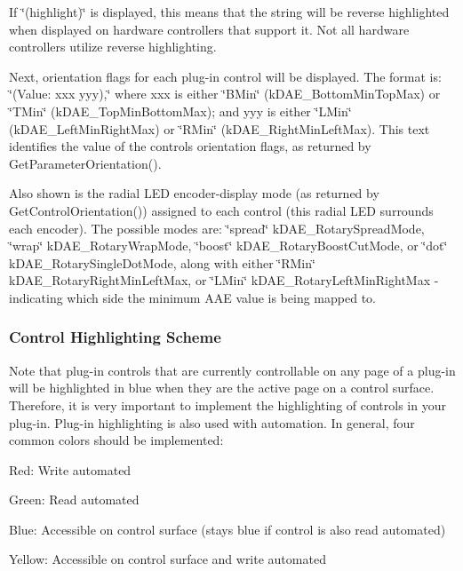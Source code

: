 \begin{DoxyItemize}
\begin{DoxyItemize}
\item If \char`\"{}(highlight)\char`\"{} is displayed, this means that the string will be reverse highlighted when displayed on hardware controllers that support it. Not all hardware controllers utilize reverse highlighting. 
\item Next, orientation flags for each plug-\/in control will be displayed. The format is\+: \char`\"{}(\+Value\+: xxx yyy),\char`\"{} where xxx is either \char`\"{}\+B\+Min\char`\"{} (k\+D\+A\+E\+\_\+\+Bottom\+Min\+Top\+Max) or \char`\"{}\+T\+Min\char`\"{} (k\+D\+A\+E\+\_\+\+Top\+Min\+Bottom\+Max); and yyy is either \char`\"{}\+L\+Min\char`\"{} (k\+D\+A\+E\+\_\+\+Left\+Min\+Right\+Max) or \char`\"{}\+R\+Min\char`\"{} (k\+D\+A\+E\+\_\+\+Right\+Min\+Left\+Max). This text identifies the value of the control\textquotesingle{}s orientation flags, as returned by Get\+Parameter\+Orientation(). 
\item Also shown is the radial L\+ED encoder-\/display mode (as returned by Get\+Control\+Orientation()) assigned to each control (this radial L\+ED surrounds each encoder). The possible modes are\+: \char`\"{}spread\char`\"{} k\+D\+A\+E\+\_\+\+Rotary\+Spread\+Mode, \char`\"{}wrap\char`\"{} k\+D\+A\+E\+\_\+\+Rotary\+Wrap\+Mode, \char`\"{}boost\char`\"{} k\+D\+A\+E\+\_\+\+Rotary\+Boost\+Cut\+Mode, or \char`\"{}dot\char`\"{} k\+D\+A\+E\+\_\+\+Rotary\+Single\+Dot\+Mode, along with either \char`\"{}\+R\+Min\char`\"{} k\+D\+A\+E\+\_\+\+Rotary\+Right\+Min\+Left\+Max, or \char`\"{}\+L\+Min\char`\"{} k\+D\+A\+E\+\_\+\+Rotary\+Left\+Min\+Right\+Max -\/ indicating which side the minimum A\+AE value is being mapped to.  
\end{DoxyItemize}
\end{DoxyItemize}

\hypertarget{a00833_subsection_control_highlighting_scheme}{}\subsubsection{Control Highlighting Scheme}\label{a00833_subsection_control_highlighting_scheme}
Note that plug-\/in controls that are currently controllable on any page of a plug-\/in will be highlighted in blue when they are the active page on a control surface. Therefore, it is very important to implement the highlighting of controls in your plug-\/in. Plug-\/in highlighting is also used with automation. In general, four common colors should be implemented\+: 
\begin{DoxyItemize}
\item Red\+: Write automated  
\item Green\+: Read automated 
\item Blue\+: Accessible on control surface (stays blue if control is also read automated)  
\item Yellow\+: Accessible on control surface and write automated  
\end{DoxyItemize}


